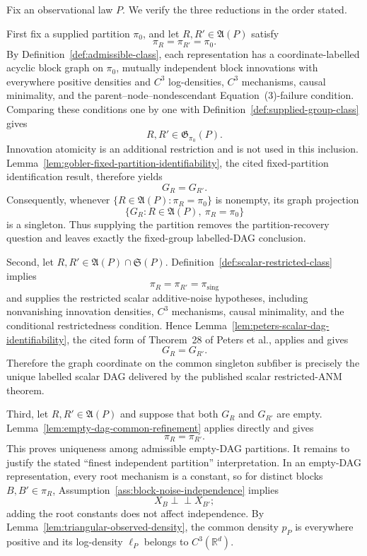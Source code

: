 Fix an observational law \(P\).  We verify the three reductions in the order stated.

First fix a supplied partition \(\pi_0\), and let \(R,R'\in\mathfrak A(P)\) satisfy
\[
\pi_R=\pi_{R'}=\pi_0.
\]
By Definition~\ref{def:admissible-class}, each representation has a coordinate-labelled acyclic block graph on \(\pi_0\), mutually independent block innovations with everywhere positive densities and \(C^3\) log-densities, \(C^3\) mechanisms, causal minimality, and the parent--node--nondescendant Equation~(3)-failure condition.  Comparing these conditions one by one with Definition~\ref{def:supplied-group-class} gives
\[
R,R'\in\mathfrak G_{\pi_0}(P).
\]
Innovation atomicity is an additional restriction and is not used in this inclusion.  Lemma~\ref{lem:gobler-fixed-partition-identifiability}, the cited fixed-partition identification result, therefore yields
\[
G_R=G_{R'}.
\]
Consequently, whenever \(\{R\in\mathfrak A(P):\pi_R=\pi_0\}\) is nonempty, its graph projection
\[
\{G_R:R\in\mathfrak A(P),\ \pi_R=\pi_0\}
\]
is a singleton.  Thus supplying the partition removes the partition-recovery question and leaves exactly the fixed-group labelled-DAG conclusion.

Second, let \(R,R'\in\mathfrak A(P)\cap\mathfrak S(P)\).  Definition~\ref{def:scalar-restricted-class} implies
\[
\pi_R=\pi_{R'}=\pi_{\mathrm{sing}}
\]
and supplies the restricted scalar additive-noise hypotheses, including nonvanishing innovation densities, \(C^3\) mechanisms, causal minimality, and the conditional restrictedness condition.  Hence Lemma~\ref{lem:peters-scalar-dag-identifiability}, the cited form of Theorem~28 of Peters et al., applies and gives
\[
G_R=G_{R'}.
\]
Therefore the graph coordinate on the common singleton subfiber is precisely the unique labelled scalar DAG delivered by the published scalar restricted-ANM theorem.

Third, let \(R,R'\in\mathfrak A(P)\) and suppose that both \(G_R\) and \(G_{R'}\) are empty.  Lemma~\ref{lem:empty-dag-common-refinement} applies directly and gives
\[
\pi_R=\pi_{R'}.
\]
This proves uniqueness among admissible empty-DAG partitions.  It remains to justify the stated ``finest independent partition'' interpretation.  In an empty-DAG representation, every root mechanism is a constant, so for distinct blocks \(B,B'\in\pi_R\), Assumption~\ref{ass:block-noise-independence} implies
\[
X_B\perp\!\!\!\perp X_{B'};
\]
adding the root constants does not affect independence.  By Lemma~\ref{lem:triangular-observed-density}, the common density \(p_P\) is everywhere positive and its log-density \(\ell_P\) belongs to \(C^3(\mathbb R^d)\).

